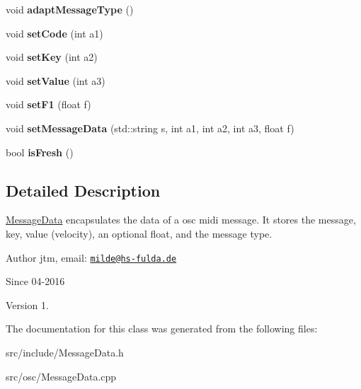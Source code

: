 \begin{DoxyCompactItemize}
\item 
\hypertarget{classosc_1_1MessageData_a0f8ce5f6d5c4452e26656236ee7aefc3}{void {\bfseries adapt\-Message\-Type} ()}\label{classosc_1_1MessageData_a0f8ce5f6d5c4452e26656236ee7aefc3}

\item 
\hypertarget{classosc_1_1MessageData_a8639583a844208ccae9568bb68d1e547}{void {\bfseries set\-Code} (int a1)}\label{classosc_1_1MessageData_a8639583a844208ccae9568bb68d1e547}

\item 
\hypertarget{classosc_1_1MessageData_a54a0ddfb44fba671ba243914b037e231}{void {\bfseries set\-Key} (int a2)}\label{classosc_1_1MessageData_a54a0ddfb44fba671ba243914b037e231}

\item 
\hypertarget{classosc_1_1MessageData_a24e273f0a4443505ccf6222405cfb567}{void {\bfseries set\-Value} (int a3)}\label{classosc_1_1MessageData_a24e273f0a4443505ccf6222405cfb567}

\item 
\hypertarget{classosc_1_1MessageData_a94dce06ace95a93c075dbaf253e559fe}{void {\bfseries set\-F1} (float f)}\label{classosc_1_1MessageData_a94dce06ace95a93c075dbaf253e559fe}

\item 
\hypertarget{classosc_1_1MessageData_a9eb7741e4216075b0e03c554d83e35ae}{void {\bfseries set\-Message\-Data} (std\-::string s, int a1, int a2, int a3, float f)}\label{classosc_1_1MessageData_a9eb7741e4216075b0e03c554d83e35ae}

\item 
\hypertarget{classosc_1_1MessageData_a169f4e7ec5a0eb896cfccd8186b5fe8d}{bool {\bfseries is\-Fresh} ()}\label{classosc_1_1MessageData_a169f4e7ec5a0eb896cfccd8186b5fe8d}

\end{DoxyCompactItemize}


\subsection{Detailed Description}
\hyperlink{classosc_1_1MessageData}{Message\-Data} encapsulates the data of a osc midi message. It stores the message, key, value (velocity), an optional float, and the message type.

\begin{DoxyAuthor}{Author}
jtm, email\-:  \href{mailto:milde@hs-fulda.de}{\tt milde@hs-\/fulda.\-de} 
\end{DoxyAuthor}
\begin{DoxySince}{Since}
04-\/2016 
\end{DoxySince}
\begin{DoxyVersion}{Version}
1. 
\end{DoxyVersion}


The documentation for this class was generated from the following files\-:\begin{DoxyCompactItemize}
\item 
src/include/Message\-Data.\-h\item 
src/osc/Message\-Data.\-cpp\end{DoxyCompactItemize}
